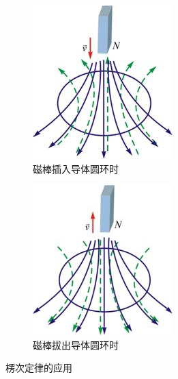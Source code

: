 \documentclass[12pt]{article}
\begin{document}
\begin{figure}[!h]
	\centering
	\begin{subfigure}{0.25\linewidth}
		\centering
		\includegraphics[width=0.9\linewidth]{graphics/楞次定律1.png}
		\caption{磁棒插入导体圆环时}
	\end{subfigure}
	\centering
	\begin{subfigure}{0.25\linewidth}
		\centering
		\includegraphics[width=0.9\linewidth]{graphics/楞次定律2.png}
		\caption{磁棒拔出导体圆环时}
	\end{subfigure}
    \caption{楞次定律的应用}
\end{figure}
\end{document}
